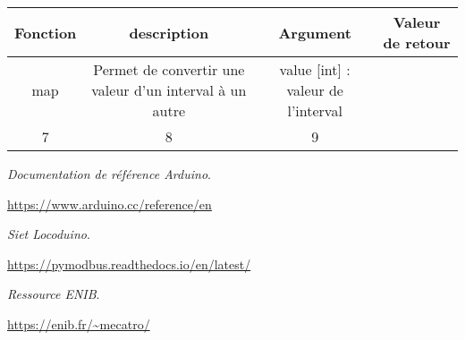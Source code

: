 \documentclass[12pt]{report}
\begin{document}
\begin{center}
   \begin{tabular}{ | c | c | c | c | }
     \hline
     Fonction & description & Argument & Valeur de retour \\ \hline
     map & 
     Permet de convertir une valeur d'un interval à un autre &  
     value [int] : valeur de l'interval\\ \hline
     7 & 8 & 9 \\ \hline
     \hline
   \end{tabular}
 \end{center}

\begin{thebibliography}{9}

\bibitem{}
	  \emph{Documentation de référence Arduino}.

	  \url{https://www.arduino.cc/reference/en}

\bibitem{}
	  \emph{Siet Locoduino}.

	  \url{https://pymodbus.readthedocs.io/en/latest/}

\bibitem{}
	  \emph{Ressource ENIB}.

	  \url{https://enib.fr/~mecatro/}


\end{thebibliography}


\end{document}
